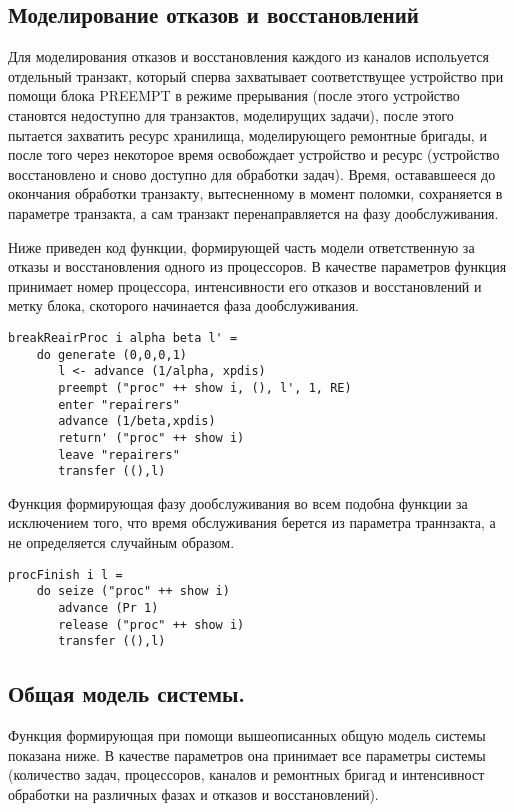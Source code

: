 \subsection{Моделирование отказов и восстановлений}

Для моделирования отказов и восстановления каждого из каналов испольуется отдельный транзакт, который сперва захватывает соответствущее устройство при помощи блока PREEMPT в режиме прерывания (после этого устройство становтся недоступно для транзактов, моделирущих задачи), после этого пытается захватить ресурс хранилища, моделирующего ремонтные бригады, и после того через некоторое время освобождает устройство и ресурс (устройство восстановлено и сново доступно для обработки задач). Время, остававшееся до окончания обработки транзакту, вытесненному в момент поломки, сохраняется в  параметре транзакта, а сам транзакт перенаправляется на фазу дообслуживания.


Ниже приведен код функции, формирующей часть модели ответственную за отказы и восстановления одного из процессоров. В качестве параметров функция принимает номер процессора, интенсивности его отказов и восстановлений и метку блока, скоторого начинается фаза дообслуживания.

\begin{verbatim}
breakReairProc i alpha beta l' = 
    do generate (0,0,0,1)
       l <- advance (1/alpha, xpdis)
       preempt ("proc" ++ show i, (), l', 1, RE)
       enter "repairers"
       advance (1/beta,xpdis)
       return' ("proc" ++ show i)
       leave "repairers"
       transfer ((),l)
\end{verbatim}

Функция формирующая фазу дообслуживания во всем подобна функции  за исключением того, что время обслуживания берется из параметра траннзакта, а не определяется случайным образом.

\begin{verbatim}
procFinish i l =
    do seize ("proc" ++ show i)
       advance (Pr 1)
       release ("proc" ++ show i)
       transfer ((),l)
\end{verbatim}

\subsection {Общая модель системы.}

Функция формирующая при помощи вышеописанных общую модель системы показана ниже. В качестве параметров она принимает все параметры системы (количество задач, процессоров, каналов и ремонтных бригад и интенсивност обработки на различных фазах и отказов и восстановлений).

